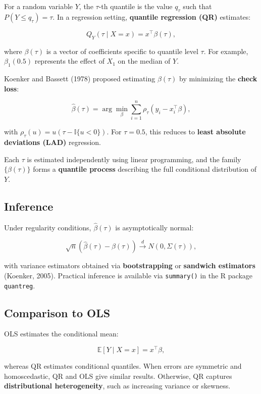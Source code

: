 \documentclass[fleqn,8pt]{latex/stylish_article} %
\begin{document}
For a random variable \(Y\), the \(\tau\)-th quantile is the value \(q_\tau\) such that \(P(Y \le q_\tau) = \tau\). In a regression setting, \textbf{quantile regression (QR)} estimates:

\[
Q_Y(\tau \mid X = x) = x^\top \beta(\tau),
\]

where \(\beta(\tau)\) is a vector of coefficients specific to quantile level \(\tau\). For example, \(\beta_1(0.5)\) represents the effect of \(X_1\) on the median of \(Y\).

Koenker and Bassett (1978) proposed estimating \(\beta(\tau)\) by minimizing the \textbf{check loss}:

\[
\hat\beta(\tau) = \arg\min_\beta \sum_{i=1}^n \rho_\tau(y_i - x_i^\top \beta),
\]

with \(\rho_\tau(u) = u(\tau - \mathbb{I}\{u < 0\})\). For \(\tau = 0.5\), this reduces to \textbf{least absolute deviations (LAD)} regression.

Each \(\tau\) is estimated independently using linear programming, and the family \(\{\beta(\tau)\}\) forms a \textbf{quantile process} describing the full conditional distribution of \(Y\).

\subsection{Inference}\label{inference}

Under regularity conditions, \(\hat\beta(\tau)\) is asymptotically normal:

\[
\sqrt{n}(\hat\beta(\tau) - \beta(\tau)) \overset{d}{\to} N(0, \Sigma(\tau)),
\]

with variance estimators obtained via \textbf{bootstrapping} or \textbf{sandwich estimators} (Koenker, 2005). Practical inference is available via \texttt{summary()} in the R package \texttt{quantreg}.

\subsection{Comparison to OLS}\label{comparison-to-ols}

OLS estimates the conditional mean:

\[
\mathbb{E}[Y \mid X = x] = x^\top \beta,
\]

whereas QR estimates conditional quantiles. When errors are symmetric and homoscedastic, QR and OLS give similar results. Otherwise, QR captures \textbf{distributional heterogeneity}, such as increasing variance or skewness.
\end{document}
